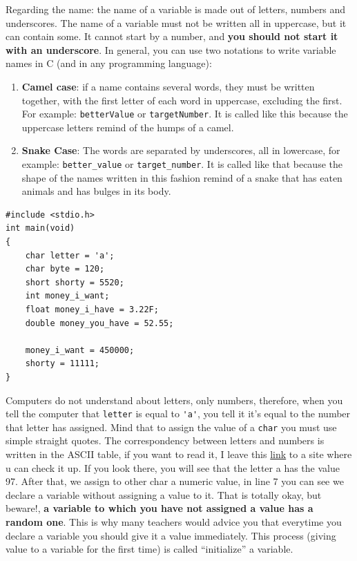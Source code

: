 \documentclass[a4paper]{article}
\begin{document}
Regarding the name: the name of a variable is made out of letters, numbers and
underscores. The name of a variable must not be written all in uppercase, but
it can contain some. It cannot start by a number, and \textbf{you should not start
it with an underscore}. In general, you can use two notations to write variable
names in C (and in any programming language):
\begin{enumerate}
    \item \textbf{Camel case}: if a name contains several words, they must be
    written together, with the first letter of each word in uppercase,
    excluding the first. For example: \verb!betterValue! or \verb!targetNumber!.
    It is called like this
    because the uppercase letters remind of the humps of a camel.
    \item \textbf{Snake Case}: The words are separated by underscores, all in
    lowercase, for example:  \texttt{better\_value} or \texttt{target\_number}. It is
    called like that because the shape of the names written in this fashion
    remind of a snake that has eaten animals and has bulges in its body.
\end{enumerate}

\noindent
\begin{minipage}[H]{\linewidth}
\mbox{}
\begin{lstlisting}[style=C, caption={Declaration and assignment of variables},
label={lst:variableAsignation}]
#include <stdio.h>
int main(void)
{
    char letter = 'a';
    char byte = 120;
    short shorty = 5520;
    int money_i_want;
    float money_i_have = 3.22F;
    double money_you_have = 52.55;

    money_i_want = 450000;
    shorty = 11111;
}
\end{lstlisting}
\end{minipage}

Computers do not understand about letters, only numbers, therefore, when you
tell the computer that \verb!letter! is equal to \verb!'a'!, you tell it it's
equal to the number that letter has assigned. Mind that to assign the value
of a \verb!char! you must use simple straight quotes. The correspondency between
letters and numbers is written in the ASCII table, if you want to read it, I
leave this \href{https://www.ascii-code.com/}{link} to a site where u can
check it up. If you look there, you will see that the letter a has the value
97. After that, we assign to other char a numeric value, in line 7 you can see
we declare a variable without assigning a value to it. That is totally okay, but
beware!, \textbf{a variable to which you have not assigned a value has a random
one}. This is why many teachers would advice you that everytime you declare a
variable you should give it a value immediately. This process (giving value to
a variable for the first time) is called ``initialize'' a variable.
\end{document}
